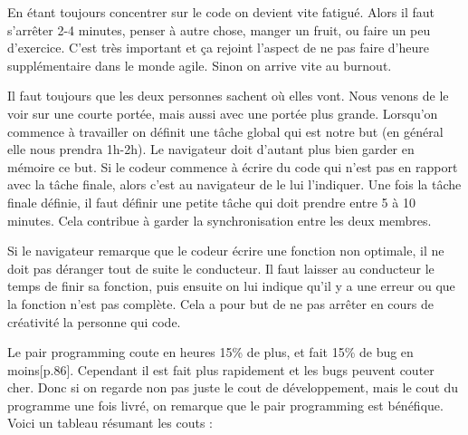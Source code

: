 \documentclass[journal, a4paper, frenchb]{IEEEtran}
\begin{document}
En étant toujours concentrer sur le code on devient vite fatigué. Alors il  faut s’arrêter 2-4 minutes, penser à autre chose, manger un fruit, ou faire un peu d’exercice. C’est très important et ça rejoint l’aspect de ne pas faire d’heure supplémentaire dans le monde agile. Sinon on arrive vite au burnout.

Il faut toujours que les deux personnes sachent où elles vont. Nous venons de le voir sur une courte portée, mais aussi avec une portée plus grande. Lorsqu’on commence à travailler on définit une tâche global qui est notre but (en général elle nous prendra 1h-2h). Le navigateur doit d’autant plus bien garder en mémoire ce but. Si le codeur commence à écrire du code qui n’est pas en rapport avec la tâche finale, alors c’est au navigateur de le lui l’indiquer. Une fois la tâche finale définie, il faut définir une petite tâche qui doit prendre entre 5 à 10 minutes. Cela contribue à garder la synchronisation entre les deux membres.

Si le navigateur remarque que le codeur écrire une fonction non optimale, il ne doit pas déranger tout de suite le conducteur. Il faut laisser au conducteur le temps de finir sa fonction, puis ensuite on lui indique qu’il y a une erreur ou que la fonction n’est pas complète. Cela a pour but de ne pas arrêter en cours de créativité la personne qui code.

Le pair programming coute en heures 15\% de plus, et fait 15\% de bug en moins[p.86]. Cependant il est fait plus rapidement et les bugs peuvent couter cher. Donc si on regarde non pas juste le cout de développement, mais le cout du programme une fois livré, on remarque que le pair programming est bénéfique. Voici un tableau résumant les couts :
\end{document}

